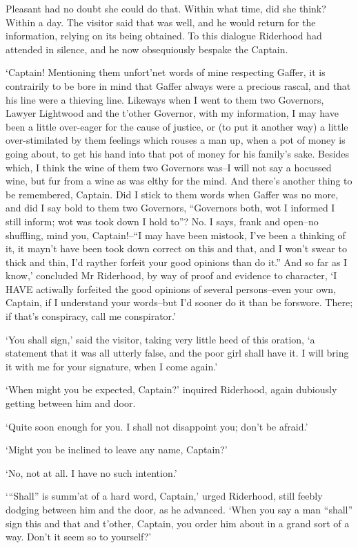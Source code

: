 Pleasant had no doubt she could do that. Within what time, did she
think? Within a day. The visitor said that was well, and he would return
for the information, relying on its being obtained. To this dialogue
Riderhood had attended in silence, and he now obsequiously bespake the
Captain.

‘Captain! Mentioning them unfort’net words of mine respecting Gaffer,
it is contrairily to be bore in mind that Gaffer always were a precious
rascal, and that his line were a thieving line. Likeways when I went to
them two Governors, Lawyer Lightwood and the t’other Governor, with
my information, I may have been a little over-eager for the cause of
justice, or (to put it another way) a little over-stimilated by them
feelings which rouses a man up, when a pot of money is going about,
to get his hand into that pot of money for his family’s sake. Besides
which, I think the wine of them two Governors was--I will not say
a hocussed wine, but fur from a wine as was elthy for the mind. And
there’s another thing to be remembered, Captain. Did I stick to them
words when Gaffer was no more, and did I say bold to them two Governors,
“Governors both, wot I informed I still inform; wot was took down I hold
to”? No. I says, frank and open--no shuffling, mind you, Captain!--“I
may have been mistook, I’ve been a thinking of it, it mayn’t have been
took down correct on this and that, and I won’t swear to thick and thin,
I’d rayther forfeit your good opinions than do it.” And so far as
I know,’ concluded Mr Riderhood, by way of proof and evidence to
character, ‘I HAVE actiwally forfeited the good opinions of several
persons--even your own, Captain, if I understand your words--but I’d
sooner do it than be forswore. There; if that’s conspiracy, call me
conspirator.’

‘You shall sign,’ said the visitor, taking very little heed of this
oration, ‘a statement that it was all utterly false, and the poor girl
shall have it. I will bring it with me for your signature, when I come
again.’

‘When might you be expected, Captain?’ inquired Riderhood, again
dubiously getting between him and door.

‘Quite soon enough for you. I shall not disappoint you; don’t be
afraid.’

‘Might you be inclined to leave any name, Captain?’

‘No, not at all. I have no such intention.’

‘“Shall” is summ’at of a hard word, Captain,’ urged Riderhood, still
feebly dodging between him and the door, as he advanced. ‘When you say a
man “shall” sign this and that and t’other, Captain, you order him about
in a grand sort of a way. Don’t it seem so to yourself?’

